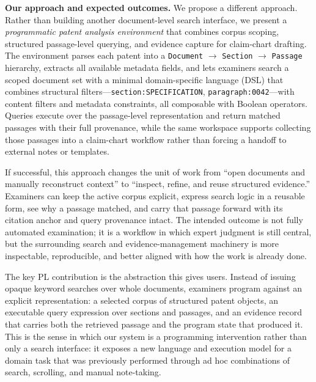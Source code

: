 \documentclass[sigconf]{acmart}
\newcommand{\DocSectionPassage}{\texttt{Document} $\to$ \texttt{Section} $\to$ \texttt{Passage}}
\begin{document}
\smallskip\noindent\textbf{Our approach and expected outcomes.}
We propose a different approach. Rather than building another document-level
search interface, we present a \emph{programmatic patent analysis environment}
that combines corpus scoping, structured passage-level querying, and evidence
capture for claim-chart drafting. The environment parses each patent into a
\DocSectionPassage{} hierarchy, extracts all available
metadata fields, and lets examiners search a scoped document set with a minimal
domain-specific language (DSL) that combines structural
filters---\texttt{section:SPECIFICATION}, \texttt{paragraph:0042}---with
content filters and metadata constraints, all composable with Boolean
operators. Queries execute over the passage-level representation and return
matched passages with their full provenance, while the same workspace supports
collecting those passages into a claim-chart workflow rather than forcing a
handoff to external notes or templates.

If successful, this approach changes the unit of work from ``open documents and
manually reconstruct context'' to ``inspect, refine, and reuse structured
evidence.'' Examiners can keep the active corpus explicit, express search logic
in a reusable form, see why a passage matched, and carry that passage forward
with its citation anchor and query provenance intact. The intended outcome is
not fully automated examination; it is a workflow in which expert judgment is
still central, but the surrounding search and evidence-management machinery is
more inspectable, reproducible, and better aligned with how the work is already
done.

The key PL contribution is the abstraction this gives users. Instead of issuing
opaque keyword searches over whole documents, examiners program against an
explicit representation: a selected corpus of structured patent objects, an
executable query expression over sections and passages, and an evidence record
that carries both the retrieved passage and the program state that produced it.
This is the sense in which our system is a programming intervention rather than
only a search interface: it exposes a new language and execution model for a
domain task that was previously performed through ad hoc combinations of search,
scrolling, and manual note-taking.
\end{document}
